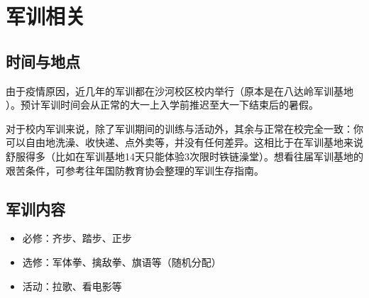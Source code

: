 \section{军训相关}

\subsection{时间与地点}

由于疫情原因，近几年的军训都在沙河校区校内举行（原本是在八达岭军训基地 ）。预计军训时间会从正常的大一上入学前推迟至大一下结束后的暑假。

对于校内军训来说，除了军训期间的训练与活动外，其余与正常在校完全一致：你可以自由地洗澡、收快递、点外卖等，并没有任何差异。这相比于在军训基地来说舒服得多（比如在军训基地14天只能体验3次限时铁链澡堂）。想看往届军训基地的艰苦条件，可参考往年国防教育协会整理的军训生存指南。

\subsection{军训内容}

\begin{itemize}
    \item 必修：齐步、踏步、正步
    \item 选修：军体拳、擒敌拳、旗语等（随机分配）
    \item 活动：拉歌、看电影等
\end{itemize}

